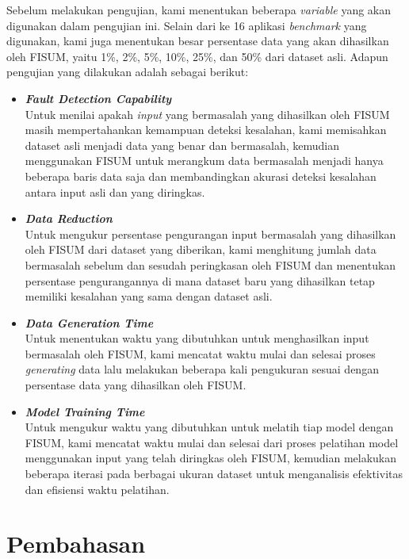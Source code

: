 Sebelum melakukan pengujian, kami menentukan beberapa 
\emph{variable} yang akan digunakan dalam pengujian ini.
Selain dari ke 16 aplikasi \emph{benchmark} yang digunakan,
kami juga menentukan besar persentase data yang akan
dihasilkan oleh FISUM, yaitu 1\%, 2\%, 5\%, 10\%, 25\%, dan
50\% dari dataset asli. Adapun pengujian yang dilakukan
adalah sebagai berikut:

\begin{itemize}
  \item \emph{\textbf{Fault Detection Capability}} \\
  Untuk menilai apakah \emph{input} yang bermasalah yang 
  dihasilkan oleh FISUM masih mempertahankan kemampuan 
  deteksi kesalahan, kami memisahkan dataset asli 
  menjadi data yang benar dan bermasalah, kemudian 
  menggunakan FISUM untuk merangkum data bermasalah 
  menjadi hanya beberapa baris data saja
  dan membandingkan akurasi deteksi kesalahan antara 
  input asli dan yang diringkas.
  \item \emph{\textbf{Data Reduction}} \\
  Untuk mengukur persentase pengurangan input bermasalah 
  yang dihasilkan oleh FISUM dari dataset yang diberikan, 
  kami menghitung jumlah data bermasalah sebelum dan 
  sesudah peringkasan oleh FISUM dan menentukan persentase 
  pengurangannya di mana dataset baru yang dihasilkan
  tetap memiliki kesalahan yang sama dengan dataset asli.
  \item \emph{\textbf{Data Generation Time}} \\
  Untuk menentukan waktu yang dibutuhkan untuk 
  menghasilkan input bermasalah oleh FISUM, kami 
  mencatat waktu mulai dan selesai proses \emph{generating} data 
  lalu melakukan beberapa kali pengukuran sesuai
  dengan persentase data yang dihasilkan oleh FISUM.
  \item \emph{\textbf{Model Training Time}} \\
  Untuk mengukur waktu yang dibutuhkan untuk melatih 
  tiap model dengan FISUM, kami mencatat waktu mulai 
  dan selesai dari proses pelatihan model menggunakan 
  input yang telah diringkas oleh FISUM, kemudian 
  melakukan beberapa iterasi pada berbagai ukuran 
  dataset untuk menganalisis efektivitas dan efisiensi 
  waktu pelatihan.
\end{itemize}

\section{Pembahasan}
\label{sec:pembahasan}

